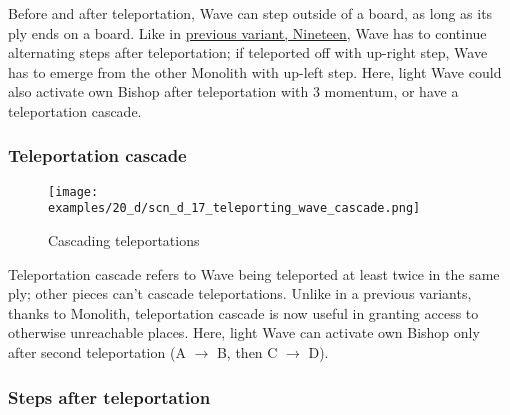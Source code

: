 \vspace*{-0.3\baselineskip}
Before and after teleportation, Wave can step outside of a board, as long as its ply ends
on a board. Like in \hyperref[fig:scn_n_08_teleport_wave_end]{previous variant, Nineteen},
Wave has to continue alternating steps after teleportation; if teleported off with up-right
step, Wave has to emerge from the other Monolith with up-left step. Here, light Wave could
also activate own Bishop after teleportation with 3 momentum, or have a teleportation cascade.

\clearpage %

\subsubsection*{Teleportation cascade}
\label{sec:Discovery/Monolith/Teleporting/Teleportation cascade}

\vspace*{-0.9\baselineskip}
\noindent
\begin{figure}[!h]
\texttt{[image: examples/20\_d/scn\_d\_17\_teleporting\_wave\_cascade.png]}
\vspace*{-1.3\baselineskip}
\caption{Cascading teleportations}
\label{fig:scn_d_17_teleporting_wave_cascade}
\end{figure}

\vspace*{-0.3\baselineskip}
Teleportation cascade refers to Wave being teleported at least twice in the same ply;
other pieces can't cascade teleportations. Unlike in a previous variants, thanks to
Monolith, teleportation cascade is now useful in granting access to otherwise unreachable
places. Here, light Wave can activate own Bishop only after second teleportation
(A $\rightarrow$ B, then C $\rightarrow$ D).

\clearpage %

\subsubsection*{Steps after teleportation}
\label{sec:Discovery/Monolith/Teleporting/Steps after teleportation}


